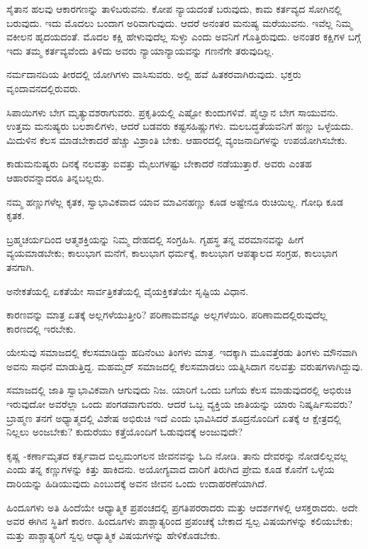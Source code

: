 ಸೈತಾನ ಹಲವು ಆಕಾರಗಣನ್ನು ತಾಳಿಬರುವನು. ಕೋಪ ನ್ಯಾಯದಂತೆ ಬರುವುದು, ಕಾಮ ಕರ್ತವ್ಯದ ಸೋಗಿನಲ್ಲಿ ಬರುವುದು. ಇದು ಮೊದಲು ಬಂದಾಗ ಅರಿವಾಗುವುದು. ಆದರೆ ಅನಂತರ ಮನುಷ್ಯ ಮರೆಯುವನು. ಇವೆಲ್ಲ ನಿಮ್ಮ ವಕೀಲನ ಹೃದಯದಂತೆ. ಮೊದಲ ಕಕ್ಷಿ ಹೇಳುವುದೆಲ್ಲ ಸುಳ್ಳು ಎಂದು ಅವನಿಗೆ ಗೊತ್ತಿರುವುದು. ಅನಂತರ ಕಕ್ಷಿಗಳ ಬಗ್ಗೆ ಇದು ತಮ್ಮ ಕರ್ತವ್ಯವೆಂದು ತಿಳಿದು ಅವರು ನ್ಯಾಯಾನ್ಯಾಯವನ್ನು ಗಣನೆಗೇ ತರುವುದಿಲ್ಲ.

ನರ್ಮದಾನದಿಯ ತೀರದಲ್ಲಿ ಯೋಗಿಗಳು ವಾಸಿಸುವರು. ಅಲ್ಲಿ ಹವೆ ಹಿತಕರವಾಗಿರುವುದು. ಭಕ್ತರು ವೃಂದಾವನದಲ್ಲಿರುವರು.

ಸಿಪಾಯಿಗಳು ಬೇಗ ಮೃತ್ಯುವಶರಾಗುವರು. ಪ್ರಕೃತಿಯಲ್ಲಿ ಎಷ್ಟೋ ಕುಂದುಗಳಿವೆ. ಪೈಲ್ವಾನ ಬೇಗ ಸಾಯುವನು. ಉತ್ತಮ ಮನುಷ್ಯರು  ಬಲಶಾಲಿಗಳು, ಆದರೆ ಬಡವರು ಕಷ್ಟಸಹಿಷ್ಣುಗಳು. ಮಲಬದ್ಧತೆಯವನಿಗೆ ಹಣ್ಣು ಒಳ್ಳೆಯದು. ಮಿದುಳಿನ ಕೆಲಸ ಮಾಡಬೇಕಾದರೆ ಹೆಚ್ಚು ವಿಶ್ರಾಂತಿ ಬೇಕು. ಆಹಾರದಲ್ಲಿ ವ್ಯಂಜನಾದಿಗಳನ್ನು ಉಪಯೋಗಿಸಬೇಕು.

ಕಾಡುಮನುಷ್ಯರು ದಿನಕ್ಕೆ ನಲವತ್ತು ಐವತ್ತು ಮೈಲುಗಳಷ್ಟು ಬೇಕಾದರೆ ನಡೆಯುತ್ತಾರೆ. ಅವರು ಎಂತಹ ಆಹಾರವನ್ನಾದರೂ ತಿನ್ನಬಲ್ಲರು.

ನಮ್ಮ ಹಣ್ಣುಗಳೆಲ್ಲ ಕೃತಕ, ಸ್ವಾಭಾವಿಕವಾದ ಯಾವ ಮಾವಿನಹಣ್ಣು ಕೂಡ ಅಷ್ಟೇನೂ ರುಚಿಯಿಲ್ಲ. ಗೋಧಿ ಕೂಡ ಕೃತಕ.

ಬ್ರಹ್ಮಚರ್ಯದಿಂದ ಆತ್ಮಶಕ್ತಿಯನ್ನು ನಿಮ್ಮ ದೇಹದಲ್ಲಿ ಸಂಗ್ರಹಿಸಿ. ಗೃಹಸ್ಥ ತನ್ನ ವರಮಾನವನ್ನು ಹೀಗೆ ವ್ಯಯಮಾಡಬೇಕು; ಕಾಲುಭಾಗ ಮನೆಗೆ, ಕಾಲುಭಾಗ ಧರ್ಮಕ್ಕೆ, ಕಾಲುಭಾಗ ಆಪತ್ಕಾಲದ ಸಂಗ್ರಹ, ಕಾಲುಭಾಗ ತನಗಾಗಿ.

ಅನೇಕತೆಯಲ್ಲಿ ಏಕತೆಯೇ ಸಾರ್ವತ್ರಿಕತೆಯಲ್ಲಿ ವೈಯಕ್ತಿಕತೆಯೇ ಸೃಷ್ಟಿಯ ವಿಧಾನ.

ಕಾರಣವನ್ನು ಮಾತ್ರ ಏತಕ್ಕೆ ಅಲ್ಲಗಳೆಯುತ್ತೀರಿ? ಪರಿಣಾಮವನ್ನೂ ಅಲ್ಲಗಳೆಯಿರಿ. ಪರಿಣಾಮದಲ್ಲಿರುವುದೆಲ್ಲ ಕಾರಣದಲ್ಲಿ ಇರಬೇಕು.

ಯೇಸುವು ಸಮಾಜದಲ್ಲಿ ಕೆಲಸಮಾಡಿದ್ದು ಹದಿನೆಂಟು ತಿಂಗಳು ಮಾತ್ರ. ಇದಕ್ಕಾಗಿ ಮೂವತ್ತೆರಡು ತಿಂಗಳು ಮೌನವಾಗಿ ಅವನು ಸಾಧನೆ ಮಾಡುತ್ತಿದ್ದ. ಮಹಮ್ಮದ್ ಸಮಾಜದಲ್ಲಿ ಕೆಲಸಮಾಡಲು ಯತ್ನಿಸಿದಾಗ ನಲವತ್ತು ವರುಷಗಳಾಗಿದ್ದುವು.

ಸಮಾಜದಲ್ಲಿ ಜಾತಿ ಸ್ವಾಭಾವಿಕವಾಗಿ ಆಗುವುದು ನಿಜ. ಯಾರಿಗೆ ಒಂದು ಬಗೆಯ ಕೆಲಸ ಮಾಡುವುದರಲ್ಲಿ ಅಭಿರುಚಿ ಇರುವುದೋ ಅವರೆಲ್ಲಾ ಒಂದು ಪಂಗಡವಾಗುವರು. ಆದರೆ ಒಬ್ಬ ವ್ಯಕ್ತಿಯ ಜಾತಿಯನ್ನು ಯಾರು ನಿಷ್ಕರ್ಷಿಸುವರು? ಬ್ರಾಹ್ಮಣ ತನಗೆ ಅಧ್ಯಾತ್ಮದಲ್ಲಿ ವಿಶೇಷ ಅಭಿರುಚಿ ಇದೆ ಎಂದು ಭಾವಿಸಿದರೆ ಶೂದ್ರನೊಂದಿಗೆ ಏತಕ್ಕೆ ಆ ಕ್ಷೇತ್ರದಲ್ಲಿ ನಿಲ್ಲಲು ಅಂಜಬೇಕು? ಕುದುರೆಯು ಕತ್ತೆಯೊಂದಿಗೆ ಓಡುವುದಕ್ಕೆ ಅಂಜುವುದೇ?

ಕೃಷ್ಣ -ಕರ್ಣಾಮೃತದ ಕರ್ತೃವಾದ ಬಿಲ್ವಮಂಗಲನ ಜೀವನವನ್ನು ಓದಿ ನೋಡಿ. ತಾನು ದೇವರನ್ನು ನೋಡಲಿಲ್ಲವಲ್ಲ ಎಂದು ತನ್ನ ಕಣ್ಣುಗಳನ್ನು ಕಿತ್ತು ಹಾಕಿದನು. ಅಯೋಗ್ಯವಾದ ದಾರಿಗೆ ತಿರುಗಿದ ಪ್ರೇಮ ಕೂಡ ಕೊನೆಗೆ ಒಳ್ಳೆಯ ದಾರಿಯನ್ನು ಹಿಡಿಯುವುದು ಎಂಬುದಕ್ಕೆ ಅವನ ಜೀವನ ಒಂದು ಉದಾಹರಣೆಯಾಗಿದೆ.

ಹಿಂದೂಗಳು ಅತಿ ಹಿಂದೆಯೇ ಆಧ್ಯಾತ್ಮಿಕ ಪ್ರಪಂಚದಲ್ಲಿ ಪ್ರಗತಿಪರರಾದರು ಮತ್ತು ಆದರ್ಶಗಳಲ್ಲಿ ಆಸಕ್ತರಾದರು. ಅದೇ ಅವರ ಈಗಿನ ಸ್ಥಿತಿಗೆ ಕಾರಣ. ಹಿಂದೂಗಳು ಪಾಶ್ಚಾತ್ಯರಿಂದ ಪ್ರಪಂಚಕ್ಕೆ ಬೇಕಾದ ಸ್ವಲ್ಪ ವಿಷಯಗಳನ್ನು ಕಲಿಯಬೇಕು; ಮತ್ತು ಪಾಶ್ಚಾತ್ಯರಿಗೆ ಸ್ವಲ್ಪ ಆಧ್ಯಾತ್ಮಿಕ ವಿಷಯಗಳನ್ನು ಹೇಳಿಕೊಡಬೇಕು.

